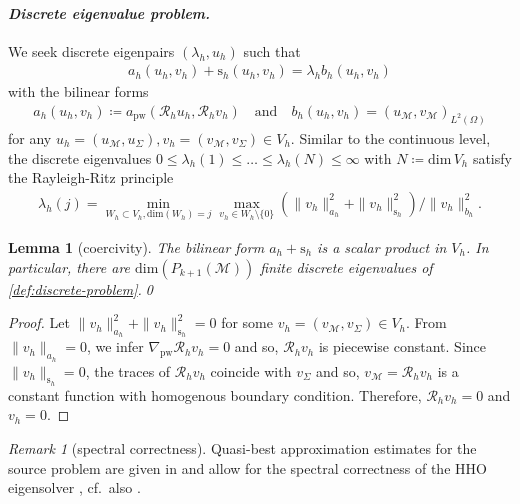 \documentclass[a4paper]{amsart}
\numberwithin{equation}{section}
\newcommand{\Mcal}{\mathcal{M}}
\newcommand{\s}{\mathrm{s}}
\newcommand{\pw}{\mathrm{pw}}
\newtheorem{lemma}[theorem]{Lemma}
\theoremstyle{remark}
\newtheorem{remark}[theorem]{Remark}
\theoremstyle{definition}
\theoremstyle{assumptionnoperiod}
\begin{document}
\paragraph{\emph{Discrete eigenvalue problem.}} We seek discrete eigenpairs $(\lambda_h,u_h)$ such that 
\begin{align}\label{def:discrete-problem}
	a_h(u_h,v_h) + \s_h(u_h,v_h) = \lambda_h b_h(u_h,v_h)
\end{align}
with the bilinear forms
\begin{align}\label{def:discrete-bilinear-forms-laplace}
	a_h(u_h,v_h) \coloneqq a_\pw(\mathcal{R}_h u_h, \mathcal{R}_h v_h) \quad\text{and}\quad b_h(u_h,v_h) = (u_\Mcal, v_\Mcal)_{L^2(\Omega)}
\end{align}
for any $u_h = (u_\Mcal, u_\Sigma), v_h = (v_\Mcal, v_\Sigma) \in V_h$.
Similar to the continuous level, the discrete eigenvalues $0 \leq \lambda_h(1) \leq \dots \leq \lambda_h(N) \leq \infty$ with $N \coloneqq \mathrm{dim}\,V_h$ satisfy the Rayleigh-Ritz principle
\begin{align}\label{eq:min-max-principle-discrete}
	\lambda_h(j) = \min_{W_h \subset V_h, \mathrm{dim}(W_h) = j} \max_{v_h \in W_h \setminus\{0\}} (\|v_h\|_{a_h}^2 + \|v_h\|_{\s_h}^2)/\|v_h\|_{b_h}^2.
\end{align}

\begin{lemma}[coercivity]\label{lem:well-posedness-laplace}
	The bilinear form $a_h + \s_h$ is a scalar product in $V_h$.
	In particular, there are $\mathrm{dim}(P_{k+1}(\Mcal))$ finite discrete eigenvalues of \eqref{def:discrete-problem}.\qed
\end{lemma}
\begin{proof}
	Let $\|v_h\|_{a_h}^2 + \|v_h\|_{\s_h}^2 = 0$ for some $v_h = (v_\Mcal, v_\Sigma) \in V_h$.
	From $\|v_h\|_{a_h} = 0$, we infer 
	$\nabla_\pw \mathcal{R}_h v_h = 0$ and so, $\mathcal{R}_h v_h$ is piecewise constant. 
	Since $\|v_h\|_{\s_h} = 0$, the traces of $\mathcal{R}_h v_h$ coincide with $v_\Sigma$ and so, $v_\Mcal = \mathcal{R}_h v_h$ is a constant function with homogenous boundary condition. Therefore, $\mathcal{R}_h v_h = 0$ and $v_h = 0$. 
\end{proof}

\begin{remark}[spectral correctness]
	Quasi-best approximation estimates for the source problem are given in \cite{ErnZanotti2020,BertrandCarstensenGraessle2021} and allow for the spectral correctness of the HHO eigensolver \cite{CaloCicuttinDengErn2019}, cf.~also \cite[Theorem 4.4]{LiangTran2025}.
\end{remark}
\end{document}
